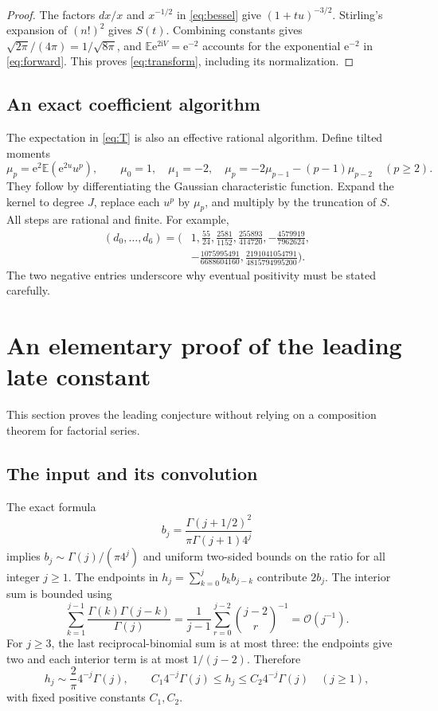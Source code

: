 \documentclass[11pt,letterpaper]{article}
\numberwithin{equation}{section}
\theoremstyle{remark}\newtheorem{remark}[theorem]{Remark}
\newcommand{\E}{\mathbb E}
\newcommand{\e}{\mathrm e}
\newcommand{\ii}{\mathrm i}
\newcommand{\Ord}{\mathcal O}
\begin{document}
\begin{proof}
The factors $dx/x$ and $x^{-1/2}$ in \eqref{eq:bessel} give $(1+tu)^{-3/2}$. Stirling's expansion of $(n!)^2$ gives $S(t)$. Combining constants gives $\sqrt{2\pi}/(4\pi)=1/\sqrt{8\pi}$, and $\E\e^{2\ii V}=\e^{-2}$ accounts for the exponential $\e^{-2}$ in \eqref{eq:forward}. This proves \eqref{eq:transform}, including its normalization.
\end{proof}

\subsection{An exact coefficient algorithm}
The expectation in \eqref{eq:T} is also an effective rational algorithm. Define tilted moments
\[
 \mu_p=\e^2\E(\e^{2u}u^p),\qquad
 \mu_0=1,\quad\mu_1=-2,\quad
 \mu_p=-2\mu_{p-1}-(p-1)\mu_{p-2}\quad(p\ge2).
\]
They follow by differentiating the Gaussian characteristic function. Expand the kernel to degree $J$, replace each $u^p$ by $\mu_p$, and multiply by the truncation of $S$. All steps are rational and finite. For example,
\begin{align}\label{eq:dsmall}
 (d_0,\ldots,d_6)=\bigg(&1,\frac{55}{24},\frac{2581}{1152},
 \frac{255893}{414720},-\frac{4579919}{7962624},\nonumber\\
 &-\frac{1075995491}{6688604160},
 \frac{2191041054791}{4815794995200}\bigg).
\end{align}
The two negative entries underscore why eventual positivity must be stated carefully.

\section{An elementary proof of the leading late constant}
This section proves the leading conjecture without relying on a composition theorem for factorial series.

\subsection{The input and its convolution}
The exact formula
\begin{equation}\label{eq:bexact}
 b_j=\frac{\Gamma(j+1/2)^2}{\pi\Gamma(j+1)4^j}
\end{equation}
implies $b_j\sim\Gamma(j)/(\pi4^j)$ and uniform two-sided bounds on the ratio for all integer $j\ge1$. The endpoints in $h_j=\sum_{k=0}^j b_kb_{j-k}$ contribute $2b_j$. The interior sum is bounded using
\[
 \sum_{k=1}^{j-1}\frac{\Gamma(k)\Gamma(j-k)}{\Gamma(j)}
 =\frac1{j-1}\sum_{r=0}^{j-2}\binom{j-2}{r}^{-1}=\Ord(j^{-1}).
\]
For $j\ge3$, the last reciprocal-binomial sum is at most three: the endpoints give two and each interior term is at most $1/(j-2)$. Therefore
\begin{equation}\label{eq:hasym}
 h_j\sim\frac2\pi4^{-j}\Gamma(j),\qquad
 C_1 4^{-j}\Gamma(j)\le h_j\le C_2 4^{-j}\Gamma(j)\quad(j\ge1),
\end{equation}
with fixed positive constants $C_1,C_2$.
\end{document}
